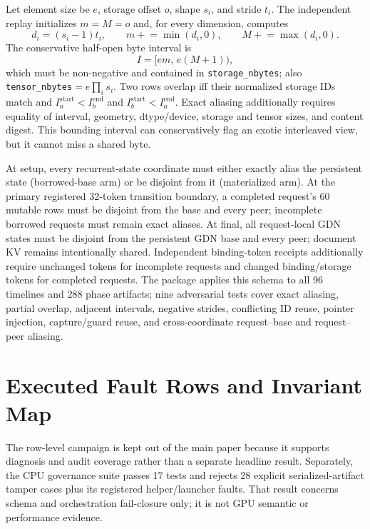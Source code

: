 \documentclass{article}
\begin{document}
Let element size be $e$, storage offset $o$, shape $s_i$, and stride $t_i$.
The independent replay initializes $m=M=o$ and, for every dimension, computes
\begin{equation}
  d_i=(s_i-1)t_i,\qquad
  m\mathrel{+}=\min(d_i,0),\qquad
  M\mathrel{+}=\max(d_i,0).
\end{equation}
The conservative half-open byte interval is
\begin{equation}
  I=[em,\,e(M+1)),
\end{equation}
which must be non-negative and contained in \texttt{storage\_nbytes}; also
\texttt{tensor\_nbytes}$=e\prod_i s_i$.  Two rows overlap iff their normalized
storage IDs match and $I_a^{\mathrm{start}}<I_b^{\mathrm{end}}$ and
$I_b^{\mathrm{start}}<I_a^{\mathrm{end}}$.  Exact aliasing additionally
requires equality of interval, geometry, dtype/device, storage and tensor
sizes, and content digest.  This bounding interval can conservatively flag an
exotic interleaved view, but it cannot miss a shared byte.

At setup, every recurrent-state coordinate must either exactly alias the
persistent state (borrowed-base arm) or be disjoint from it (materialized
arm).  At the primary registered 32-token transition boundary, a completed
request's 60 mutable rows must be disjoint from the base and every peer;
incomplete borrowed requests must
remain exact aliases.  At final, all request-local GDN states must be disjoint
from the persistent GDN base and every peer; document KV remains intentionally
shared.
Independent binding-token receipts additionally require unchanged tokens for
incomplete requests and changed binding/storage tokens for completed requests.
The package applies this schema to all 96 timelines and 288 phase artifacts;
nine adversarial tests cover exact aliasing, partial overlap, adjacent
intervals, negative strides, conflicting ID reuse, pointer injection,
capture/guard reuse, and cross-coordinate request--base and request--peer
aliasing.

\section{Executed Fault Rows and Invariant Map}
\label{app:invariants}

The row-level campaign is kept out of the main paper because it supports
diagnosis and audit coverage rather than a separate headline result.
Separately, the CPU governance suite passes 17 tests and rejects 28 explicit
serialized-artifact tamper cases plus its registered helper/launcher faults.
That result concerns schema and orchestration fail-closure only; it is not GPU
semantic or performance evidence.

\end{document}
